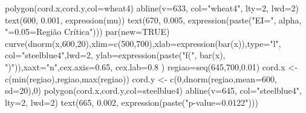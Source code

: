 \documentclass[
  letterpaper,
  DIV=11,
  numbers=noendperiod]{scrartcl}
\newenvironment{Shaded}{\begin{snugshade}}{\end{snugshade}}
\newcommand{\AttributeTok}[1]{\textcolor[rgb]{0.40,0.45,0.13}{#1}}
\newcommand{\ConstantTok}[1]{\textcolor[rgb]{0.56,0.35,0.01}{#1}}
\newcommand{\DecValTok}[1]{\textcolor[rgb]{0.68,0.00,0.00}{#1}}
\newcommand{\FloatTok}[1]{\textcolor[rgb]{0.68,0.00,0.00}{#1}}
\newcommand{\FunctionTok}[1]{\textcolor[rgb]{0.28,0.35,0.67}{#1}}
\newcommand{\NormalTok}[1]{\textcolor[rgb]{0.00,0.23,0.31}{#1}}
\newcommand{\OtherTok}[1]{\textcolor[rgb]{0.00,0.23,0.31}{#1}}
\newcommand{\StringTok}[1]{\textcolor[rgb]{0.13,0.47,0.30}{#1}}
\begin{document}
\begin{Shaded}
\begin{Highlighting}[]
\FunctionTok{polygon}\NormalTok{(cord.x,cord.y,}\AttributeTok{col=}\StringTok{\textquotesingle{}wheat4\textquotesingle{}}\NormalTok{)}
\FunctionTok{abline}\NormalTok{(}\AttributeTok{v=}\DecValTok{633}\NormalTok{, }\AttributeTok{col=}\StringTok{"wheat4"}\NormalTok{, }\AttributeTok{lty=}\DecValTok{2}\NormalTok{, }\AttributeTok{lwd=}\DecValTok{2}\NormalTok{)}
\FunctionTok{text}\NormalTok{(}\DecValTok{600}\NormalTok{, }\FloatTok{0.001}\NormalTok{, }\FunctionTok{expression}\NormalTok{(mu))}
\FunctionTok{text}\NormalTok{(}\DecValTok{670}\NormalTok{, }\FloatTok{0.005}\NormalTok{, }\FunctionTok{expression}\NormalTok{(}\FunctionTok{paste}\NormalTok{(}\StringTok{"EI="}\NormalTok{, alpha, }\StringTok{"=0.05=Região Crítica"}\NormalTok{)))}
\FunctionTok{par}\NormalTok{(}\AttributeTok{new=}\ConstantTok{TRUE}\NormalTok{)}
\FunctionTok{curve}\NormalTok{(}\FunctionTok{dnorm}\NormalTok{(x,}\DecValTok{600}\NormalTok{,}\DecValTok{20}\NormalTok{),}\AttributeTok{xlim=}\FunctionTok{c}\NormalTok{(}\DecValTok{500}\NormalTok{,}\DecValTok{700}\NormalTok{),}\AttributeTok{xlab=}\FunctionTok{expression}\NormalTok{(}\FunctionTok{bar}\NormalTok{(x)),}\AttributeTok{type=}\StringTok{"l"}\NormalTok{,}
      \AttributeTok{col=}\StringTok{"steelblue4"}\NormalTok{,}\AttributeTok{lwd=}\DecValTok{2}\NormalTok{, }\AttributeTok{ylab=}\FunctionTok{expression}\NormalTok{(}\FunctionTok{paste}\NormalTok{(}\StringTok{"f("}\NormalTok{, }\FunctionTok{bar}\NormalTok{(x),}
      \StringTok{")"}\NormalTok{)),}\AttributeTok{xaxt=}\StringTok{"n"}\NormalTok{,}\AttributeTok{cex.axis=}\FloatTok{0.65}\NormalTok{, }\AttributeTok{cex.lab=}\FloatTok{0.8}\NormalTok{ ) }
\NormalTok{regiao}\OtherTok{=}\FunctionTok{seq}\NormalTok{(}\DecValTok{645}\NormalTok{,}\DecValTok{700}\NormalTok{,}\FloatTok{0.01}\NormalTok{)}
\NormalTok{cord.x }\OtherTok{\textless{}{-}} \FunctionTok{c}\NormalTok{(}\FunctionTok{min}\NormalTok{(regiao),regiao,}\FunctionTok{max}\NormalTok{(regiao))}
\NormalTok{cord.y }\OtherTok{\textless{}{-}} \FunctionTok{c}\NormalTok{(}\DecValTok{0}\NormalTok{,}\FunctionTok{dnorm}\NormalTok{(regiao,}\AttributeTok{mean=}\DecValTok{600}\NormalTok{, }\AttributeTok{sd=}\DecValTok{20}\NormalTok{),}\DecValTok{0}\NormalTok{)}
\FunctionTok{polygon}\NormalTok{(cord.x,cord.y,}\AttributeTok{col=}\StringTok{\textquotesingle{}steelblue4\textquotesingle{}}\NormalTok{)}
\FunctionTok{abline}\NormalTok{(}\AttributeTok{v=}\DecValTok{645}\NormalTok{, }\AttributeTok{col=}\StringTok{"steelblue4"}\NormalTok{, }\AttributeTok{lty=}\DecValTok{2}\NormalTok{, }\AttributeTok{lwd=}\DecValTok{2}\NormalTok{)}
\FunctionTok{text}\NormalTok{(}\DecValTok{665}\NormalTok{, }\FloatTok{0.002}\NormalTok{, }\FunctionTok{expression}\NormalTok{(}\FunctionTok{paste}\NormalTok{(}\StringTok{"p{-}value=0.0122"}\NormalTok{)))}
\end{Highlighting}
\end{Shaded}
\end{document}
